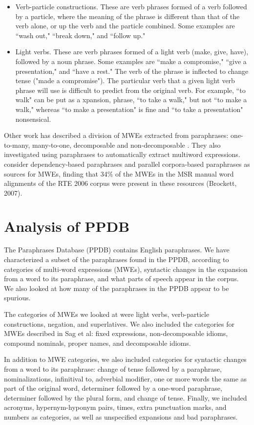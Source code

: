 \documentclass[11pt]{article}
\begin{document}
\begin{itemize}
\item Verb-particle constructions. These are verb phrases formed of a verb followed by a particle, where the meaning of the phrase is different than that of the verb alone, or up the verb and the particle combined. Some examples are ``wash out," ``break down," and ``follow up." 

\item Light verbs. These are verb phrases formed of a light verb (make, give, have), followed by a noun phrase. Some examples are ``make a compromise," ``give a presentation," and ``have a rest." The verb of the phrase is inflected to change tense ("made a compromise"). The particular verb that a given light verb phrase will use is difficult to predict from the original verb. For example, ``to walk" can be put as a xpansion,  phrase, ``to take a walk," but not ``to make a walk," whereas ``to make a presentation" is fine and ``to take a presentation" nonsensical.
\end{itemize}

Other work has described a division of MWEs extracted from paraphrases: one-to-many, many-to-one,  decomposable and non-decomposable \cite{dpm}. They also investigated using paraphrases to automatically extract multiword expressions. \cite{dpm} consider dependency-based paraphrases and parallel corpora-based paraphrases as sources for MWEs, finding that 34\% of the MWEs in the MSR manual word alignments of the RTE 2006 corpus were present in these resources (Brockett, 2007). 

\section{Analysis of PPDB}\label{analysis}
The Paraphrases Database (PPDB) contains English paraphrases. We have characterized a subset of the paraphrases found in the PPDB, according to categories of multi-word expressions (MWEs), syntactic changes in the expansion from a word to its paraphrase, and what parts of speech appear in the corpus. We also looked at how many of the paraphrases in the PPDB appear to be spurious.

The categories of MWEs we looked at were light verbs, verb-particle constructions, negation, and superlatives. We also included the categories for MWEs described in Sag et al: fixed expressions, non-decomposable idioms, compound nominals, proper names, and decomposable idioms. 

In addition to MWE categories, we also included categories for syntactic changes from a word to its paraphrase: change of tense followed by a paraphrase, nominalizations, infinitival to, adverbial modifier, one or more words the same as part of the original word, determiner followed by a one-word paraphrase, determiner followed by the plural form, and change of tense. Finally, we included acronyms, hypernym-hyponym pairs, times, extra punctuation marks, and numbers as categories, as well as unspecified expansions and bad paraphrases. 
\end{document}
